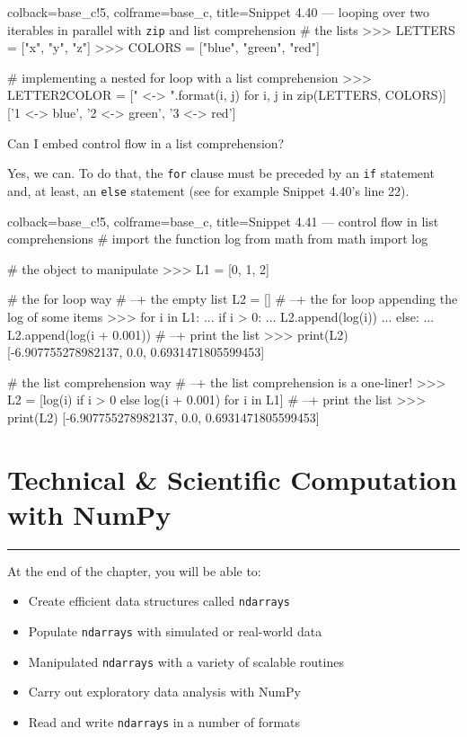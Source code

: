 \documentclass[a4paper,11pt]{book}
\newcommand{\question}[1]{%
    \begin{tcolorbox}[colback=comp_c!10,colframe=comp_c,sidebyside align=top,width=\linewidth,before skip=1ex]
        #1
    \end{tcolorbox}
    \switchcolumn%
}
\newcommand{\note}[1]{%
    \begin{tcolorbox}[colback=white!0,colframe=white!10,width=\linewidth,before skip=1ex]
        #1
    \end{tcolorbox}
}
\begin{document}
\begin{pythoncode}[linenos=true,]{colback=base_c!5, colframe=base_c, title=\sffamily Snippet 4.40 ---  looping over two iterables in parallel with \texttt{zip} and list comprehension}
# the lists 
>>> LETTERS = ["x", "y", "z"]
>>> COLORS = ["blue", "green", "red"]

# implementing a nested for loop with a list comprehension
>>> LETTER2COLOR = ["{} <-> {}".format(i, j) for i, j in zip(LETTERS, COLORS)]
['1 <-> blue', '2 <-> green', '3 <-> red']
\end{pythoncode}

\begin{paracol}{2}
	\question{\raggedright Can I embed control flow in a list comprehension?}
	\note{Yes, we can. To do that, the \texttt{for} clause must be preceded by an \texttt{if} statement and, at least, an \texttt{else} statement (see for example Snippet 4.40's line 22). }
\end{paracol}

\begin{pythoncode}[linenos=true,]{colback=base_c!5, colframe=base_c, title=\sffamily Snippet 4.41 --- control flow in list comprehensions}
# import the function log from math 
from math import log

# the object to manipulate
>>> L1 = [0, 1, 2]

# the for loop way
# --+ the empty list 
L2 = []
# --+ the for loop appending the log of some items
>>> for i in L1:
...     if i > 0:
...         L2.append(log(i))
...     else:
...         L2.append(log(i + 0.001))
# --+ print the list
>>> print(L2)
[-6.907755278982137, 0.0, 0.6931471805599453]

# the list comprehension way
# --+ the list comprehension is a one-liner!
>>> L2 = [log(i) if i > 0 else log(i + 0.001) for i in L1]
# --+ print the list
>>> print(L2)
[-6.907755278982137, 0.0, 0.6931471805599453]
\end{pythoncode}

\theendnotes

\chapter{Technical \& Scientific Computation with NumPy}
\label{ch:tech_sci_computation}

\par\noindent\rule{\textwidth}{0.4pt}

At the end of the chapter, you will be able to:
\begin{itemize}
	\item Create efficient data structures called \texttt{ndarrays}
	\item Populate \texttt{ndarrays} with simulated or real-world data
	\item Manipulated \texttt{ndarrays} with a variety of scalable routines
	\item Carry out exploratory data analysis with NumPy
	\item Read and write \texttt{ndarrays} in a number of formats
\end{itemize}
\end{document}

